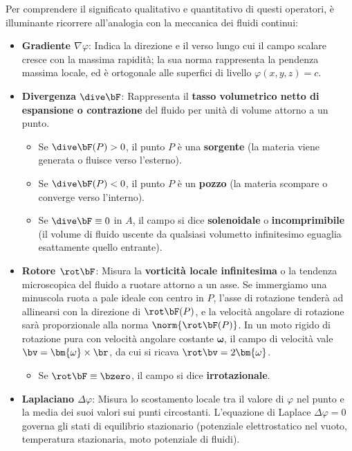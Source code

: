 Per comprendere il significato qualitativo e quantitativo di questi operatori, è illuminante ricorrere all'analogia con la meccanica dei fluidi continui:

\begin{itemize}
    \item \textbf{Gradiente $\nabla \varphi$}: Indica la direzione e il verso lungo cui il campo scalare cresce con la massima rapidità; la sua norma rappresenta la pendenza massima locale, ed è ortogonale alle superfici di livello $\varphi(x,y,z) = c$.
    \item \textbf{Divergenza $\dive \bF$}: Rappresenta il \textbf{tasso volumetrico netto di espansione o contrazione} del fluido per unità di volume attorno a un punto.
    \begin{itemize}
        \item Se $\dive \bF(P) > 0$, il punto $P$ è una \textbf{sorgente} (la materia viene generata o fluisce verso l'esterno).
        \item Se $\dive \bF(P) < 0$, il punto $P$ è un \textbf{pozzo} (la materia scompare o converge verso l'interno).
        \item Se $\dive \bF \equiv 0$ in $A$, il campo si dice \textbf{solenoidale} o \textbf{incomprimibile} (il volume di fluido uscente da qualsiasi volumetto infinitesimo eguaglia esattamente quello entrante).
    \end{itemize}
    \item \textbf{Rotore $\rot \bF$}: Misura la \textbf{vorticità locale infinitesima} o la tendenza microscopica del fluido a ruotare attorno a un asse. Se immergiamo una minuscola ruota a pale ideale con centro in $P$, l'asse di rotazione tenderà ad allinearsi con la direzione di $\rot \bF(P)$, e la velocità angolare di rotazione sarà proporzionale alla norma $\norm{\rot \bF(P)}$. In un moto rigido di rotazione pura con velocità angolare costante $\bm{\omega}$, il campo di velocità vale $\bv = \bm{\omega} \times \br$, da cui si ricava $\rot \bv = 2\bm{\omega}$.
    \begin{itemize}
        \item Se $\rot \bF \equiv \bzero$, il campo si dice \textbf{irrotazionale}.
    \end{itemize}
    \item \textbf{Laplaciano $\Delta \varphi$}: Misura lo scostamento locale tra il valore di $\varphi$ nel punto e la media dei suoi valori sui punti circostanti. L'equazione di Laplace $\Delta \varphi = 0$ governa gli stati di equilibrio stazionario (potenziale elettrostatico nel vuoto, temperatura stazionaria, moto potenziale di fluidi).
\end{itemize}

